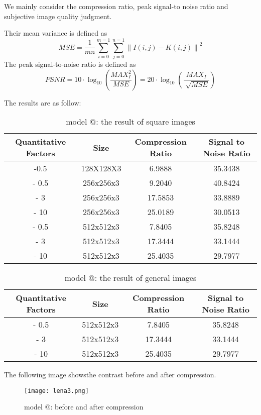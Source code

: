 \documentclass{mcmthesis}
\makeatletter
\newcommand{\Rmnum}[1]{\expandafter\@slowromancap\romannumeral #1@}
\makeatother
\begin{document}
We mainly consider the compression ratio, peak signal-to noise ratio and subjective image quality judgment.

Their mean variance is defined as
\begin{equation}
  MSE = \frac1{mn}\sum_{i=0}^{m=1}\sum_{j=0}^{n=1}{\left\|I(i,j)-K(i,j)\right\|}^2
\end{equation}
The peak signal-to-noise ratio is defined as
\begin{equation}
  PSNR = 10\cdot\log_{10}\left(\frac{{MAX}_I^2}{MSE}\right)=20\cdot\log_{10}\left(\frac{{MAX}_I}{\sqrt[]{MSE}}\right)
\end{equation}

The results are as follow:
\begin{table}[h]
\centering
\caption{model \Rmnum{1}: the result of square images }
\begin{tabular}{|c|c|c|c|}
\hline
Quantitative Factors & Size & Compression Ratio & Signal to Noise Ratio\\
\hline
-0.5 & 128X128X3 & 6.9888 & 35.3438\\
\hline
- 0.5 & 256x256x3 & 9.2040& 40.8424\\
\hline
- 3 & 256x256x3& 17.5853& 33.8889\\
\hline
- 10 & 256x256x3& 25.0189& 30.0513\\
\hline
- 0.5& 512x512x3& 7.8405 & 35.8248 \\
\hline
- 3 &  512x512x3& 17.3444& 33.1444 \\
\hline
- 10 & 512x512x3& 25.4035 &29.7977 \\
\hline
\end{tabular}
\label{tab2}
\end{table}

\begin{table}[h]
\centering
\caption{model \Rmnum{1}: the result of general images }
\begin{tabular}{|c|c|c|c|}
\hline
Quantitative Factors & Size & Compression Ratio & Signal to Noise Ratio\\
\hline
- 0.5 &512x512x3& 7.8405 & 35.8248 \\
\hline
- 3 &  512x512x3& 17.3444 &33.1444 \\
\hline
- 10 & 512x512x3& 25.4035& 29.7977 \\
\hline
\end{tabular}
\label{tab2}
\end{table}

The following image showsthe contrast before and after compression.
\begin{figure}[h]
\centering
\texttt{[image: lena3.png]}
\caption{model \Rmnum{1}:  before and after compression} \label{fig: model \Rmnum{1}:  before and after compression}
\end{figure}
\end{document}
